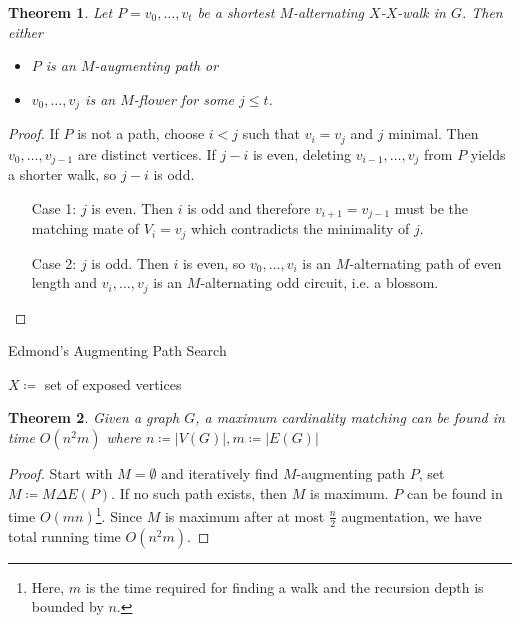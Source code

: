 \documentclass[11pt, a4paper]{article}
\newcommand{\abs}[1]{\left\lvert#1\right\rvert}
\newtheorem{theorem}{Theorem}[section]
\theoremstyle{remark}
\theoremstyle{definition}
\begin{document}
\begin{theorem}\label{thm:augmenting-path-blossom}
	Let $P=v_0,\ldots,v_t$ be a shortest $M$-alternating $X$-$X$-walk in $G$.
	Then either
	\begin{itemize}
		\item $P$ is an $M$-augmenting path \emph{or}
		\item $v_0,\ldots,v_j$ is an $M$-flower for some $j\leq t$.
	\end{itemize}
\end{theorem}
\begin{proof}
	If $P$ is not a path, choose $i<j$ such that $v_i=v_j$ and $j$ minimal.
	Then $v_0,\ldots,v_{j-1}$ are distinct vertices. If $j-i$ is even,
	deleting $v_{i-1},\ldots,v_j$ from $P$ yields a shorter walk, so $j-i$
	is odd.
	\begin{enumerate}
		\item[Case 1:] $j$ is even. Then $i$ is odd and therefore $v_{i+1}=v_{j-1}$
		must be the matching mate of $V_i=v_j$ which contradicts the
		minimality of $j$.
		\item[Case 2:] $j$ is odd. Then $i$ is even, so $v_0,\ldots,v_i$ is an
		$M$-alternating path of even length and $v_i,\ldots,v_j$ is an
		$M$-alternating odd circuit, i.e. a blossom.
	\end{enumerate}
\end{proof}

\begin{algorithm}
	\caption{Edmond's Augmenting Path Search}
	$X\coloneqq$ set of exposed vertices\;
\end{algorithm}

\begin{theorem}
	Given a graph $G$, a maximum cardinality matching can be found in time
	$O(n^2m)$ where $n\coloneqq\abs{V(G)}, m\coloneqq\abs{E(G)}$
\end{theorem}
\begin{proof}
	Start with $M=\emptyset$ and iteratively find $M$-augmenting path $P$,
	set $M\coloneqq M\Delta E(P)$. If no such path exists, then $M$ is
	maximum. $P$ can be found in time $O(mn)$\footnote{
		Here, $m$ is the time required for finding a walk and the recursion
		depth is bounded by $n$.
	}. Since $M$ is maximum after at most $\frac{n}{2}$ augmentation, we have
	total running time $O(n^2m)$.
\end{proof}
\end{document}
